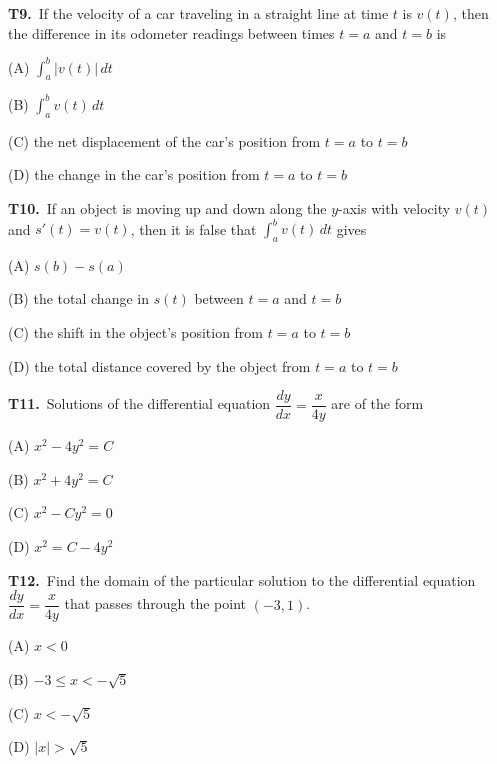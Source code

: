 \documentclass[11pt]{article}
\begin{document}
\bigskip\noindent\textbf{T9.}\ If the velocity of a car traveling in a straight line at time $t$ is $v(t)$, then the difference in its odometer readings between times $t=a$ and $t=b$ is
\begin{list}{}{\setlength{\leftmargin}{3em}\setlength{\labelwidth}{2.5em}\setlength{\itemsep}{0pt}\setlength{\topsep}{2pt}}
\item[(A)] $\displaystyle\int_a^b |v(t)|\,dt$
\item[(B)] $\displaystyle\int_a^b v(t)\,dt$
\item[(C)] the net displacement of the car's position from $t=a$ to $t=b$
\item[(D)] the change in the car's position from $t=a$ to $t=b$
\end{list}

\bigskip\noindent\textbf{T10.}\ If an object is moving up and down along the $y$-axis with velocity $v(t)$ and $s'(t)=v(t)$, then it is false that $\displaystyle\int_a^b v(t)\,dt$ gives
\begin{list}{}{\setlength{\leftmargin}{3em}\setlength{\labelwidth}{2.5em}\setlength{\itemsep}{0pt}\setlength{\topsep}{2pt}}
\item[(A)] $s(b)-s(a)$
\item[(B)] the total change in $s(t)$ between $t=a$ and $t=b$
\item[(C)] the shift in the object's position from $t=a$ to $t=b$
\item[(D)] the total distance covered by the object from $t=a$ to $t=b$
\end{list}

\bigskip\noindent\textbf{T11.}\ Solutions of the differential equation $\dfrac{dy}{dx}=\dfrac{x}{4y}$ are of the form
\begin{list}{}{\setlength{\leftmargin}{3em}\setlength{\labelwidth}{2.5em}\setlength{\itemsep}{0pt}\setlength{\topsep}{2pt}}
\item[(A)] $x^2-4y^2=C$
\item[(B)] $x^2+4y^2=C$
\item[(C)] $x^2-Cy^2=0$
\item[(D)] $x^2=C-4y^2$
\end{list}

\bigskip\noindent\textbf{T12.}\ Find the domain of the particular solution to the differential equation $\dfrac{dy}{dx}=\dfrac{x}{4y}$ that passes through the point $(-3,1)$.
\begin{list}{}{\setlength{\leftmargin}{3em}\setlength{\labelwidth}{2.5em}\setlength{\itemsep}{0pt}\setlength{\topsep}{2pt}}
\item[(A)] $x<0$
\item[(B)] $-3\leq x<-\sqrt{5}$
\item[(C)] $x<-\sqrt{5}$
\item[(D)] $|x|>\sqrt{5}$
\end{list}
\end{document}

